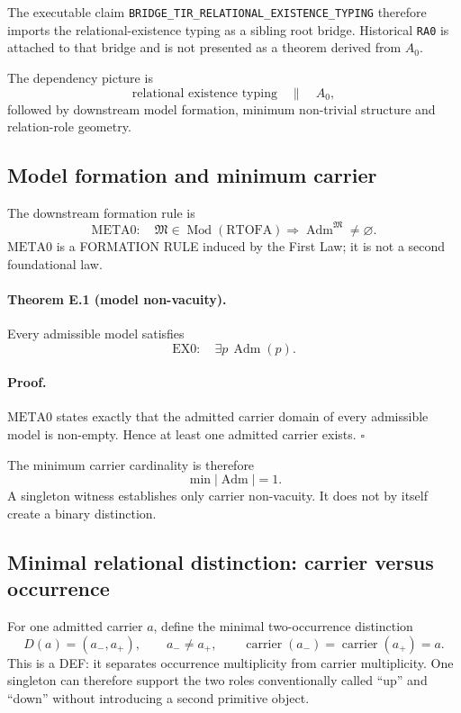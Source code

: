 \documentclass[11pt]{article}
\newcommand{\claimid}[1]{\nolinkurl{#1}}
\begin{document}
The executable claim
\claimid{BRIDGE_TIR_RELATIONAL_EXISTENCE_TYPING}
therefore imports the relational-existence typing as a sibling root bridge.
Historical \claimid{RA0} is attached to that bridge and is not presented as
a theorem derived from \(A_0\).

The dependency picture is
\[
\boxed{
\text{relational existence typing}
\quad\parallel\quad
A_0,
}
\]
followed by downstream model formation, minimum non-trivial structure and
relation-role geometry.

\subsection{Model formation and minimum carrier}

The downstream formation rule is
\[
\boxed{
\mathrm{META0}:\quad
\mathfrak M\in\operatorname{Mod}(\mathrm{RTOFA})
\Longrightarrow
\operatorname{Adm}^{\mathfrak M}\neq\varnothing.
}
\]
\(\mathrm{META0}\) is a FORMATION RULE induced by the First Law; it is
not a second foundational law.

\paragraph{Theorem E.1 (model non-vacuity).}
Every admissible model satisfies
\[
\boxed{
\mathrm{EX0}:\quad
\exists p\,\operatorname{Adm}(p).
}
\]

\paragraph{Proof.}
\(\mathrm{META0}\) states exactly that the admitted carrier domain of
every admissible model is non-empty. Hence at least one admitted carrier
exists. \(\square\)

The minimum carrier cardinality is therefore
\[
\boxed{\min|\operatorname{Adm}|=1.}
\]
A singleton witness establishes only carrier non-vacuity. It does not by
itself create a binary distinction.

\subsection{Minimal relational distinction: carrier versus occurrence}

For one admitted carrier \(a\), define the minimal two-occurrence
distinction
\[
\boxed{
D(a)=(a_-,a_+),
\qquad
a_-\neq a_+,
\qquad
\operatorname{carrier}(a_-)
=
\operatorname{carrier}(a_+)=a.
}
\]
This is a DEF: it separates occurrence multiplicity from carrier
multiplicity. One singleton can therefore support the two roles conventionally
called ``up'' and ``down'' without introducing a second primitive object.
\end{document}
